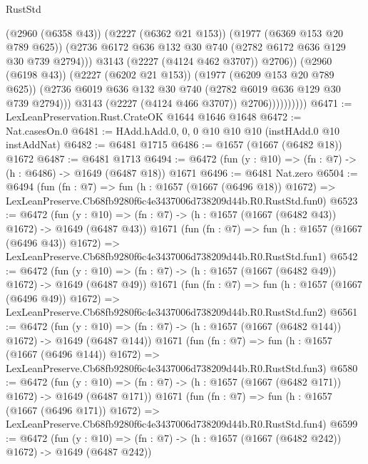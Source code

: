 \begin{lexlean}{RustStd}
\begin{coremodule}
                                (@2960 (@6358 @43))
                                (@2227 (@6362 @21 @153))
                                (@1977 (@6369 @153 @20 @789 @625))
                                (@2736
                                  @6172
                                  @636
                                  @132
                                  @30
                                  @740
                                  (@2782 @6172 @636 @129 @30 @739 @2794)))
                              @3143
                              (@2227 (@4124 @462 @3707))
                              @2706))
                          (@2960 (@6198 @43))
                          (@2227 (@6202 @21 @153))
                          (@1977 (@6209 @153 @20 @789 @625))
                          (@2736 @6019 @636 @132 @30 @740 (@2782 @6019 @636 @129 @30 @739 @2794)))
                        @3143
                        (@2227 (@4124 @466 @3707))
                        @2706))))))))))
@6471 := LexLeanPreservation.Rust.CrateOK @1644 @1646 @1648
@6472 := Nat.casesOn.{0}
@6481 := HAdd.hAdd.{0, 0, 0} @10 @10 @10 (instHAdd.{0} @10 instAddNat)
@6482 := @6481 @1715
@6486 := @1657 (@1667 (@6482 @18)) @1672
@6487 := @6481 @1713
@6494 := @6472 (fun (y : @10) => (fn : @7) -> (h : @6486) -> @1649 (@6487 @18)) @1671
@6496 := @6481 Nat.zero
@6504 := @6494
    (fun (fn : @7) =>
    fun (h : @1657 (@1667 (@6496 @18)) @1672) =>
    LexLeanPreserve.Cb68fb9280f6c4e3437006d738209d44b.R0.RustStd.fun0)
@6523 := @6472
    (fun (y : @10) => (fn : @7) -> (h : @1657 (@1667 (@6482 @43)) @1672) -> @1649 (@6487 @43))
    @1671
    (fun (fn : @7) =>
    fun (h : @1657 (@1667 (@6496 @43)) @1672) =>
    LexLeanPreserve.Cb68fb9280f6c4e3437006d738209d44b.R0.RustStd.fun1)
@6542 := @6472
    (fun (y : @10) => (fn : @7) -> (h : @1657 (@1667 (@6482 @49)) @1672) -> @1649 (@6487 @49))
    @1671
    (fun (fn : @7) =>
    fun (h : @1657 (@1667 (@6496 @49)) @1672) =>
    LexLeanPreserve.Cb68fb9280f6c4e3437006d738209d44b.R0.RustStd.fun2)
@6561 := @6472
    (fun (y : @10) => (fn : @7) -> (h : @1657 (@1667 (@6482 @144)) @1672) -> @1649 (@6487 @144))
    @1671
    (fun (fn : @7) =>
    fun (h : @1657 (@1667 (@6496 @144)) @1672) =>
    LexLeanPreserve.Cb68fb9280f6c4e3437006d738209d44b.R0.RustStd.fun3)
@6580 := @6472
    (fun (y : @10) => (fn : @7) -> (h : @1657 (@1667 (@6482 @171)) @1672) -> @1649 (@6487 @171))
    @1671
    (fun (fn : @7) =>
    fun (h : @1657 (@1667 (@6496 @171)) @1672) =>
    LexLeanPreserve.Cb68fb9280f6c4e3437006d738209d44b.R0.RustStd.fun4)
@6599 := @6472
    (fun (y : @10) => (fn : @7) -> (h : @1657 (@1667 (@6482 @242)) @1672) -> @1649 (@6487 @242))

\end{coremodule}
\end{lexlean}
